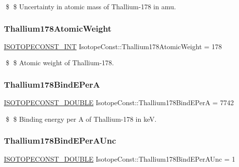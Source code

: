 \$ \$ Uncertainty in atomic mass of Thallium-\/178 in amu. \mbox{\label{group___isotope_const-_thallium-_tl178_ga18d43b06634f1d7a5ac669759b17563e}} 
\subsubsection{\texorpdfstring{Thallium178\+Atomic\+Weight}{Thallium178AtomicWeight}}
{\footnotesize\ttfamily \mbox{\hyperlink{group___isotope_const-_macros_ga5f18360b3e99483a35c32d789e62621c}{I\+S\+O\+T\+O\+P\+E\+C\+O\+N\+S\+T\+\_\+\+I\+NT}} Isotope\+Const\+::\+Thallium178\+Atomic\+Weight = 178}

\$ \$ Atomic weight of Thallium-\/178. \mbox{\label{group___isotope_const-_thallium-_tl178_ga7ac54331eb750cf061ab7d29913ac12b}} 
\subsubsection{\texorpdfstring{Thallium178\+Bind\+E\+PerA}{Thallium178BindEPerA}}
{\footnotesize\ttfamily \mbox{\hyperlink{group___isotope_const-_macros_ga8f45a7272ce02c0b4c65c44636ed719a}{I\+S\+O\+T\+O\+P\+E\+C\+O\+N\+S\+T\+\_\+\+D\+O\+U\+B\+LE}} Isotope\+Const\+::\+Thallium178\+Bind\+E\+PerA = 7742}

\$ \$ Binding energy per A of Thallium-\/178 in keV. \mbox{\label{group___isotope_const-_thallium-_tl178_gaabeded23345a927a211b52428f482ddd}} 
\subsubsection{\texorpdfstring{Thallium178\+Bind\+E\+Per\+A\+Unc}{Thallium178BindEPerAUnc}}
{\footnotesize\ttfamily \mbox{\hyperlink{group___isotope_const-_macros_ga8f45a7272ce02c0b4c65c44636ed719a}{I\+S\+O\+T\+O\+P\+E\+C\+O\+N\+S\+T\+\_\+\+D\+O\+U\+B\+LE}} Isotope\+Const\+::\+Thallium178\+Bind\+E\+Per\+A\+Unc = 1}

